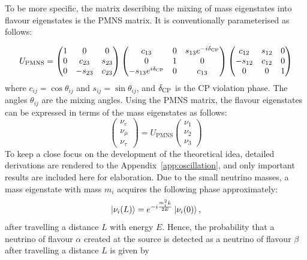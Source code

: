 To be more specific, the matrix describing the mixing of mass eigenstates into flavour eigenstates is the PMNS matrix.
It is conventionally parameterised as follows:

\begin{equation}
U_{\text{PMNS}} = 
\begin{pmatrix}
1 & 0 & 0 \\
0 & c_{23} & s_{23} \\
0 & -s_{23} & c_{23}
\end{pmatrix}
\begin{pmatrix}
c_{13} & 0 & s_{13} e^{-i\delta_\textrm{CP}} \\
0 & 1 & 0 \\
-s_{13} e^{i\delta_\textrm{CP}} & 0 & c_{13}
\end{pmatrix}
\begin{pmatrix}
c_{12} & s_{12} & 0 \\
-s_{12} & c_{12} & 0 \\
0 & 0 & 1
\end{pmatrix}
\end{equation}
where $c_{ij} = \cos\theta_{ij}$ and $s_{ij} = \sin\theta_{ij}$, and $\delta_\textrm{CP}$ is the CP violation phase.
The angles $\theta_{ij}$ are the mixing angles. 
Using the PMNS matrix, the flavour eigenstates can be expressed in terms of the mass eigenstates as follows:
\begin{equation}
\begin{pmatrix}
\nu_e \\
\nu_\mu \\
\nu_\tau
\end{pmatrix}
=
U_{\text{PMNS}}
\begin{pmatrix}
\nu_1 \\
\nu_2 \\
\nu_3
\end{pmatrix}
\end{equation}
To keep a close focus on the development of the theoretical idea, detailed derivations are rendered to the Appendix~\ref{app:oscillation}, and only important results are included here for elaboration.
Due to the small neutrino masses, a mass eigenstate with mass $m_i$ acquires the following phase approximately:
\begin{equation}
  \ket{\nu_i(L)} = e^{-i \frac{m_i^2 L}{2E}} \ket{\nu_i(0)},
\end{equation}
after travelling a distance $L$ with energy $E$.
Hence, the probability that a neutrino of flavour $\alpha$ created at the source is detected as a neutrino of flavour $\beta$ after travelling a distance $L$ is given by

